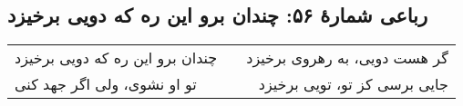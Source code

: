 \begin{center}
\section*{رباعی شمارهٔ ۵۶: چندان برو این ره که دویی برخیزد}
\label{sec:056}
\begin{longtable}{l p{0.5cm} r}
چندان برو این ره که دویی برخیزد
&&
گر هست دویی، به رهروی برخیزد
\\
تو او نشوی، ولی اگر جهد کنی
&&
جایی برسی کز تو، تویی برخیزد
\\
\end{longtable}
\end{center}
